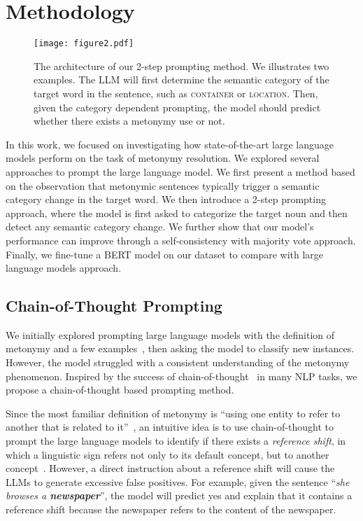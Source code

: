 \documentclass[11pt]{article}
\begin{document}
\section{Methodology}

\begin{figure*}
    \centering
    \texttt{[image: figure2.pdf]}
    \caption{The architecture of our 2-step prompting method. We illustrates two examples. The LLM will first determine the semantic category of the target word in the sentence, such as \textsc{container} or \textsc{location}. Then, given the category dependent prompting, the model should predict whether there exists a metonymy use or not.}
    \label{fig:pipeline_and_prompt}
\end{figure*}

In this work, we focused on investigating how state-of-the-art large language models perform on the task of metonymy resolution. We explored several approaches to prompt the large language model. We first present a method based on the observation that metonymic sentences typically trigger a semantic category change in the target word. We then introduce a 2-step prompting approach, where the model is first asked to categorize the target noun and then detect any semantic category change. We further show that our model's performance can improve through a self-consistency with majority vote approach. Finally, we fine-tune a BERT model on our dataset to compare with large language models approach.

\subsection{Chain-of-Thought Prompting}

We initially explored prompting large language models with the definition of metonymy and a few examples~\citep{brown2020-fewshot}, then asking the model to classify new instances. However, the model struggled with a consistent understanding of the metonymy phenomenon. Inspired by the success of chain-of-thought~\citep{wei-chain-of-thought-prompting} in many NLP tasks, we propose a chain-of-thought based prompting method.

Since the most familiar definition of metonymy is ``using one entity to refer to another that is related to it''~\citep{lakoff1980}, an intuitive idea is to use chain-of-thought to prompt the large language models to identify if there exists a \textit{reference shift}, in which a linguistic sign refers not only to its default concept, but to another concept~\citep{adel2014}. However, a direct instruction about a reference shift will cause the LLMs to generate excessive false positives. For example, given the sentence ``\textit{she browses a \textbf{newspaper}}'', the model will predict yes and explain that it contains a reference shift because the newspaper refers to the content of the newspaper.
\end{document}
